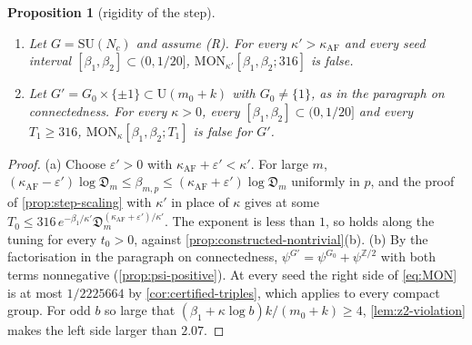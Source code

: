 \documentclass[11pt,a4paper]{amsart}
\newtheorem{proposition}[theorem]{Proposition}
\theoremstyle{definition}
\theoremstyle{remark}
\numberwithin{equation}{section}
\newcommand{\Z}{\mathbb{Z}}          %
\newcommand{\SU}{\mathrm{SU}}              %
\newcommand{\U}{\mathrm{U}}                %
\newcommand{\Mcirc}{\text{\upshape(M$^{\circ}$)}}   %
\newcommand{\tzero}{t_0}                   %
\newcommand{\Tzero}{T_0}                   %
\newcommand{\Den}{\mathfrak D}            %
\begin{document}
\begin{proposition}[rigidity of the step]\label{prop:step-rigidity}
\begin{enumerate}[label=\textup{(\alph*)},leftmargin=*]
\item Let $G=\SU(N_c)$ and assume \textup{(R)}. For every $\kappa'>\kappa_{\mathrm{AF}}$ and every seed interval $[\beta_1,\beta_2]\subset(0,1/20]$, $\mathrm{MON}_{\kappa'}[\beta_1,\beta_2;316]$ is false.
\item Let $G'=G_0\times\{\pm1\}\subset\U(m_0+k)$ with $G_0\ne\{1\}$, as in the paragraph on connectedness. For every $\kappa>0$, every $[\beta_1,\beta_2]\subset(0,1/20]$ and every $T_1\ge316$, $\mathrm{MON}_\kappa[\beta_1,\beta_2;T_1]$ is false for $G'$.
\end{enumerate}
\end{proposition}

\begin{proof}
(a) Choose $\varepsilon'>0$ with $\kappa_{\mathrm{AF}}+\varepsilon'<\kappa'$. For large $m$, $(\kappa_{\mathrm{AF}}-\varepsilon')\log \Den_m\le\beta_{m,p}\le(\kappa_{\mathrm{AF}}+\varepsilon')\log \Den_m$ uniformly in $p$, and the proof of \cref{prop:step-scaling} with $\kappa'$ in place of $\kappa$ gives \Mcirc{} at some $\Tzero\le316\,e^{-\beta_1/\kappa'}\Den_m^{(\kappa_{\mathrm{AF}}+\varepsilon')/\kappa'}$. The exponent is less than $1$, so \Mcirc{} holds along the tuning for every $\tzero>0$, against \cref{prop:constructed-nontrivial}(b).
(b) By the factorisation in the paragraph on connectedness, $\psi^{G'}=\psi^{G_0}+\psi^{\Z/2}$ with both terms nonnegative (\cref{prop:psi-positive}). At every seed the right side of \eqref{eq:MON} is at most $1/2225664$ by \cref{cor:certified-triples}, which applies to every compact group. For odd $b$ so large that $(\beta_1+\kappa\log b)k/(m_0+k)\ge4$, \cref{lem:z2-violation} makes the left side larger than $2.07$.
\end{proof}
\end{document}
